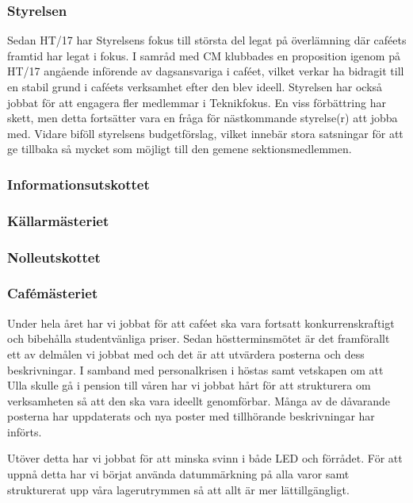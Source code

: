 \documentclass[../_main/handlingar.tex]{subfiles}
\begin{document}

\subsubsection*{Styrelsen}
Sedan HT/17 har Styrelsens fokus till största del legat på överlämning där caféets framtid har legat i fokus. I samråd med CM klubbades en proposition igenom på HT/17 angående införende av dagsansvariga i caféet, vilket verkar ha bidragit till en stabil grund i caféets verksamhet efter den blev ideell. Styrelsen har också jobbat för att engagera fler medlemmar i Teknikfokus. En viss förbättring har skett, men detta fortsätter vara en fråga för nästkommande styrelse(r) att jobba med. Vidare biföll styrelsens budgetförslag, vilket innebär stora satsningar för att ge tillbaka så mycket som möjligt till den gemene sektionsmedlemmen.

\subsubsection*{Informationsutskottet}

\subsubsection*{Källarmästeriet}

\subsubsection*{Nolleutskottet}

\subsubsection*{Cafémästeriet}
Under hela året har vi jobbat för att caféet ska vara fortsatt konkurrenskraftigt och bibehålla studentvänliga priser. Sedan höstterminsmötet är det framförallt ett av delmålen vi jobbat med och det är att utvärdera posterna och dess beskrivningar. I samband med personalkrisen i höstas samt vetskapen om att Ulla skulle gå i pension till våren har vi jobbat hårt för att strukturera om verksamheten så att den ska vara ideellt genomförbar. Många av de dåvarande posterna har uppdaterats och nya poster med tillhörande beskrivningar har införts.

Utöver detta har vi jobbat för att minska svinn i både LED och förrådet. För att uppnå detta har vi börjat använda datummärkning på alla varor samt strukturerat upp våra lagerutrymmen så att allt är mer lättillgängligt.
\end{document}
